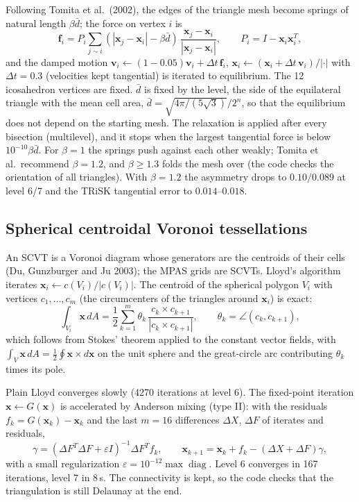 \documentclass[11pt,a4paper]{article}
\newcommand{\bv}{\mathbf{v}}
\newcommand{\bx}{\mathbf{x}}
\begin{document}
Following Tomita et al.\ (2002), the edges of the triangle mesh become springs
of natural length $\beta\bar d$; the force on vertex $i$ is
\begin{equation}
  \mathbf f_i = P_i\sum_{j\sim i}(|\bx_j-\bx_i| - \beta\bar d)\,
               \frac{\bx_j-\bx_i}{|\bx_j-\bx_i|},
  \qquad P_i = I - \bx_i\bx_i^T,
\end{equation}
and the damped motion $\bv_i\leftarrow(1-0.05)\bv_i + \Delta t\,\mathbf f_i$,
$\bx_i\leftarrow(\bx_i+\Delta t\,\bv_i)/|\cdot|$ with $\Delta t = 0.3$ (velocities kept
tangential) is iterated to equilibrium. The 12 icosahedron vertices are fixed.
$\bar d$ is fixed by the level, the side of the equilateral triangle with the
mean cell area, $\bar d = \sqrt{4\pi/(5\sqrt3)}/2^n$, so that the equilibrium
does not depend on the starting mesh. The relaxation is applied after every
bisection (multilevel), and it stops when the largest tangential force is below
$10^{-10}\beta\bar d$. For $\beta = 1$ the springs push against each other
weakly; Tomita et al.\ recommend $\beta = 1.2$, and $\beta\ge 1.3$ folds the
mesh over (the code checks the orientation of all triangles). With $\beta=1.2$
the asymmetry drops to $0.10/0.089$ at level 6/7 and the TRiSK tangential
error to $0.014$--$0.018$.

\subsection{Spherical centroidal Voronoi tessellations}

An SCVT is a Voronoi diagram whose generators are the centroids of their
cells (Du, Gunzburger and Ju 2003); the MPAS grids are SCVTs. Lloyd's algorithm
iterates $\bx_i\leftarrow c(V_i)/|c(V_i)|$. The centroid of the spherical
polygon $V_i$ with vertices $c_1,\dots,c_m$ (the circumcenters of the triangles
around $\bx_i$) is exact:
\begin{equation}
  \int_{V_i}\bx\,dA = \frac12\sum_{k=1}^m \theta_k\,
     \frac{c_k\times c_{k+1}}{|c_k\times c_{k+1}|},
  \qquad \theta_k = \angle(c_k,c_{k+1}),
\end{equation}
which follows from Stokes' theorem applied to the constant vector fields, with
$\int_{V}\bx\,dA = \tfrac12\oint \bx\times d\bx$ on the unit sphere and the great-circle
arc contributing $\theta_k$ times its pole.

Plain Lloyd converges slowly (4270 iterations at level 6). The fixed-point
iteration $\bx\leftarrow G(\bx)$ is accelerated by Anderson mixing (type II): with the residuals
$f_k = G(\bx_k)-\bx_k$ and the last $m=16$ differences
$\Delta X$, $\Delta F$ of iterates and residuals,
\[
  \gamma = (\Delta F^T\Delta F + \varepsilon I)^{-1}\Delta F^T f_k,\qquad
  \bx_{k+1} = \bx_k + f_k - (\Delta X + \Delta F)\gamma,
\]
with a small regularization $\varepsilon = 10^{-12}\max\operatorname{diag}$. Level 6
converges in 167 iterations, level 7 in 8\,s. The connectivity is kept, so the
code checks that the triangulation is still Delaunay at the end.
\end{document}
